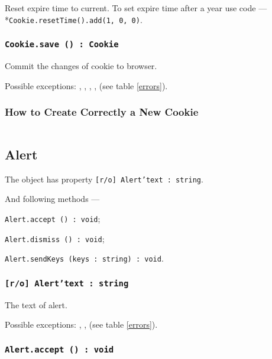 Reset expire time to current. To set expire time after a year use code —\\*\texttt{Cookie.resetTime().add(1, 0, 0)}.

\subsubsection{\texttt{Cookie.save () : Cookie}}

Commit the changes of cookie to browser.

Possible exceptions: , , , ,  (see table \ref{errors}).

\subsubsection{How to Create Correctly a New Cookie}

\inputminted[linenos]{icl}{../sources/newcookies.icL}


\subsection{Alert}

The object \alert{} has property \texttt{[r/o] Alert'text : string}.

And following methods —
\begin{icItems}
	\item \texttt{Alert.accept () : void};
	\item \texttt{Alert.dismiss () : void};
	\item \texttt{Alert.sendKeys (keys : string) : void}.
\end{icItems}

\subsubsection{\texttt{[r/o] Alert'text : string}}

The text of alert.

Possible exceptions: , ,  (see table \ref{errors}).

\subsubsection{\texttt{Alert.accept () : void}}

